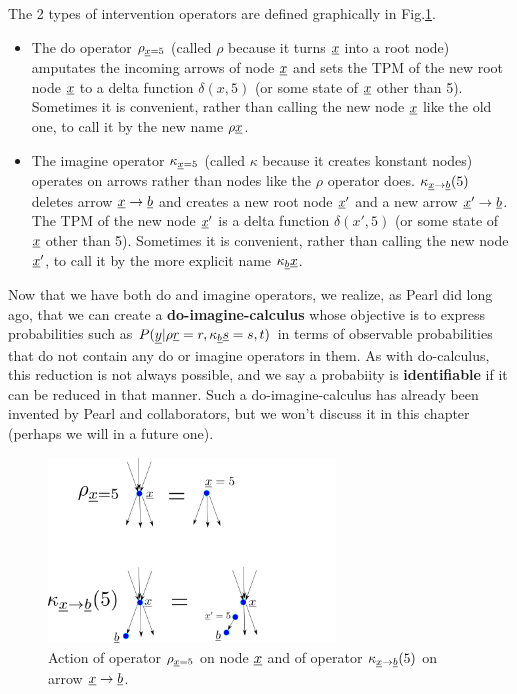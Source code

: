 The 2  types of
intervention operators
are defined 
graphically in Fig.\ref{fig-rho-kappa}.
\begin{itemize}
\item
The do operator $\rho_{{\underline{x}}=5}$
(called $\rho$ because  it turns ${\underline{x}}$
into a root node)
amputates
the incoming arrows of node ${\underline{x}}$
and sets the TPM
of the new root node ${\underline{x}}$
to a delta function $\delta(x, 5)$
(or some state of ${\underline{x}}$ other than 5).
Sometimes it is convenient,
rather than calling the
new node ${\underline{x}}$ like
the old one, to call
it by the new name $\rho{\underline{x}}$.
\item
The imagine operator $\kappa_{{\underline{x}}=5}$
(called $\kappa$ because it
 creates konstant nodes)
operates on arrows
rather than nodes like the 
$\rho$ operator does.
$\kappa_{{\underline{x}}\rightarrow{\underline{b}}}(5)$
deletes
arrow ${\underline{x}}\rightarrow{\underline{b}}$
and
creates a new root node 
${\underline{x}}'$
and a new arrow
${\underline{x}}'\rightarrow {\underline{b}}$. The
TPM of the new node ${\underline{x}}'$ is a 
delta function $\delta(x', 5)$
(or some state of ${\underline{x}}$ other than 5).
Sometimes it is convenient,
rather than calling the
new node ${\underline{x}}'$, to call
it by the 
more
explicit name $\kappa_{\underline{b}}{\underline{x}}$.
\end{itemize}

Now that we have 
both do and imagine operators,
we realize,
as Pearl did long ago,
that we can create
a {\bf do-imagine-calculus}
whose
objective
is to 
express
probabilities such as 
$P({\underline{y}}|\rho{\underline{r}}=r, 
\kappa_{\underline{b}} {\underline{s}}=s, t)$
in terms of observable 
probabilities
that do not
contain
any do or imagine
operators in them.
As with
do-calculus,
this reduction
is not 
always possible,
and we say a probabiity is
{\bf identifiable}
if it  can be reduced
in that manner.
Such a do-imagine-calculus
has already
been invented
by Pearl and collaborators,
but
we won't 
discuss it in this chapter (perhaps
we  will
in a future one).


\begin{figure}[h!]
\centering
\includegraphics[width=3in]
{counterf/rho-kappa.png}
\caption{Action
of operator $\rho_{{\underline{x}}=5}$
on node ${\underline{x}}$
and of operator 
$\kappa_{{\underline{x}}\rightarrow {\underline{b}}}(5)$
on arrow ${\underline{x}}\rightarrow {\underline{b}}$.} 
\label{fig-rho-kappa}
\end{figure}


